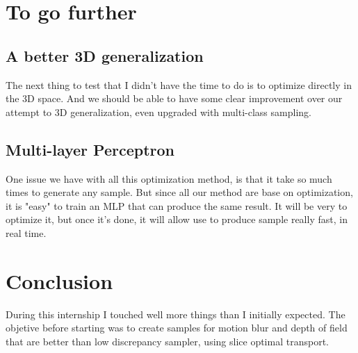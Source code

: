 \documentclass{classeENS}
\begin{document}
\section{To go further}

\subsection{A better 3D generalization}
    \> The next thing to test that I didn't have the time to do is to optimize directly 
    in the 3D space. And we should be able to have some clear improvement over our attempt
    to 3D generalization, even upgraded with multi-class sampling.

\subsection{Multi-layer Perceptron}
    One issue we have with all this optimization method, is that it take so much times
    to generate any sample. But since all our method are base on optimization, it is
    "easy" to train an MLP that can produce the same result. It will be very to
    optimize it, but once it's done, it will allow use to produce sample really fast,
    in real time.\\

\section{Conclusion}
    \> During this internship I touched well more things than I initially expected.
    The objetive before starting was to create samples for motion blur and depth of field
    that are better than low discrepancy sampler, using slice optimal transport.
\end{document}
